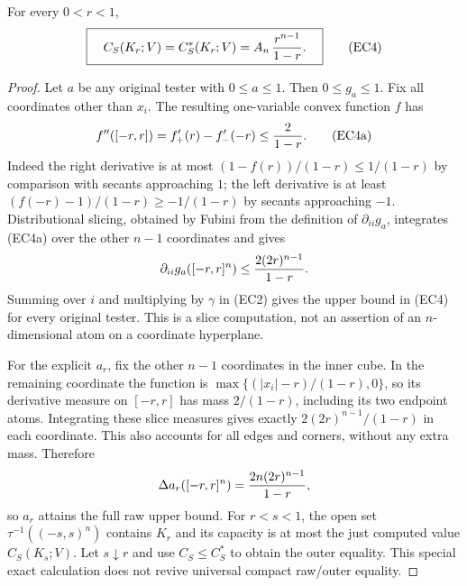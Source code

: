 \begin{proposition}
For every $0<r<1$,
\[
 \boxed{\quad C_S(K_r;V)=C_S^*(K_r;V)
             =A_n\,{r^{n-1}\over1-r}.\quad}
 \tag{EC4}
\]
\end{proposition}
\begin{proof}
Let $a$ be any original tester with $0\le a\le1$. Then
$0\le g_a\le1$. Fix all coordinates other than $x_i$. The resulting
one-variable convex function $f$ has
\[
 f''([-r,r])=f'_+(r)-f'_-(-r)\le {2\over1-r}.
 \tag{EC4a}
\]
Indeed the right derivative is at most
$(1-f(r))/(1-r)\le1/(1-r)$ by comparison with secants approaching $1$;
the left derivative is at least
$(f(-r)-1)/(1-r)\ge-1/(1-r)$ by secants approaching $-1$.
Distributional slicing, obtained by Fubini from the definition of
$\partial_{ii}g_a$, integrates (EC4a) over the other $n-1$ coordinates
and gives
\[
 \partial_{ii}g_a([-r,r]^n)\le {2(2r)^{n-1}\over1-r}.
\]
Summing over $i$ and multiplying by $\gamma$ in (EC2) gives the upper
bound in (EC4) for every original tester. This is a slice computation,
not an assertion of an $n$-dimensional atom on a coordinate hyperplane.

For the explicit $a_r$, fix the other $n-1$ coordinates in the inner
cube. In the remaining coordinate the function is
$\max\{(|x_i|-r)/(1-r),0\}$, so its derivative measure on $[-r,r]$
has mass $2/(1-r)$, including its two endpoint atoms. Integrating these
slice measures gives exactly $2(2r)^{n-1}/(1-r)$ in each coordinate.
This also accounts for all edges and corners, without any extra mass.
Therefore
\[
 \Delta a_r([-r,r]^n)={2n(2r)^{n-1}\over1-r},
\]
so $a_r$ attains the full raw upper bound. For $r<s<1$, the open set
$\tau^{-1}((-s,s)^n)$ contains $K_r$ and its capacity is at most the just
computed value $C_S(K_s;V)$. Let $s\downarrow r$ and use
$C_S\le C_S^*$ to obtain the outer equality. This special exact
calculation does not revive universal compact raw/outer equality.
\end{proof}

